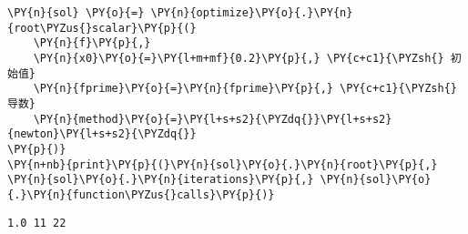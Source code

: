     \begin{tcolorbox}[breakable, size=fbox, boxrule=1pt, pad at break*=1mm,colback=cellbackground, colframe=cellborder]
\begin{Verbatim}[commandchars=\\\{\}]
\PY{n}{sol} \PY{o}{=} \PY{n}{optimize}\PY{o}{.}\PY{n}{root\PYZus{}scalar}\PY{p}{(}
    \PY{n}{f}\PY{p}{,} 
    \PY{n}{x0}\PY{o}{=}\PY{l+m+mf}{0.2}\PY{p}{,} \PY{c+c1}{\PYZsh{} 初始值}
    \PY{n}{fprime}\PY{o}{=}\PY{n}{fprime}\PY{p}{,} \PY{c+c1}{\PYZsh{} 导数}
    \PY{n}{method}\PY{o}{=}\PY{l+s+s2}{\PYZdq{}}\PY{l+s+s2}{newton}\PY{l+s+s2}{\PYZdq{}}
\PY{p}{)}
\PY{n+nb}{print}\PY{p}{(}\PY{n}{sol}\PY{o}{.}\PY{n}{root}\PY{p}{,} \PY{n}{sol}\PY{o}{.}\PY{n}{iterations}\PY{p}{,} \PY{n}{sol}\PY{o}{.}\PY{n}{function\PYZus{}calls}\PY{p}{)}
\end{Verbatim}
\end{tcolorbox}

    \begin{Verbatim}[commandchars=\\\{\}]
1.0 11 22
    \end{Verbatim}
